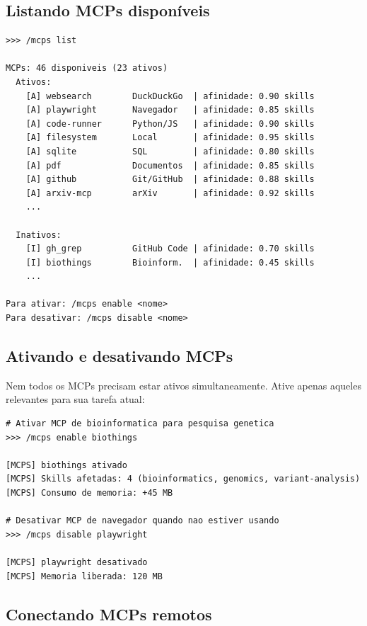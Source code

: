 \subsection{Listando MCPs disponíveis}
\label{subsec:listar-mcps}

\begin{lstlisting}[style=bashstyle, caption={Listando MCPs e seus status},
label={lst:list-mcps}]
>>> /mcps list

MCPs: 46 disponiveis (23 ativos)
  Ativos:
    [A] websearch        DuckDuckGo  | afinidade: 0.90 skills
    [A] playwright       Navegador   | afinidade: 0.85 skills
    [A] code-runner      Python/JS   | afinidade: 0.90 skills
    [A] filesystem       Local       | afinidade: 0.95 skills
    [A] sqlite           SQL         | afinidade: 0.80 skills
    [A] pdf              Documentos  | afinidade: 0.85 skills
    [A] github           Git/GitHub  | afinidade: 0.88 skills
    [A] arxiv-mcp        arXiv       | afinidade: 0.92 skills
    ...

  Inativos:
    [I] gh_grep          GitHub Code | afinidade: 0.70 skills
    [I] biothings        Bioinform.  | afinidade: 0.45 skills
    ...

Para ativar: /mcps enable <nome>
Para desativar: /mcps disable <nome>
\end{lstlisting}

\subsection{Ativando e desativando MCPs}
\label{subsec:ativar-mcps}

Nem todos os MCPs precisam estar ativos simultaneamente. Ative apenas
aqueles relevantes para sua tarefa atual:

\begin{lstlisting}[style=bashstyle, caption={Gerenciando MCPs
individuais}, label={lst:manage-mcps}]
# Ativar MCP de bioinformatica para pesquisa genetica
>>> /mcps enable biothings

[MCPS] biothings ativado
[MCPS] Skills afetadas: 4 (bioinformatics, genomics, variant-analysis)
[MCPS] Consumo de memoria: +45 MB

# Desativar MCP de navegador quando nao estiver usando
>>> /mcps disable playwright

[MCPS] playwright desativado
[MCPS] Memoria liberada: 120 MB
\end{lstlisting}

\subsection{Conectando MCPs remotos}
\label{subsec:mcps-remotos}

